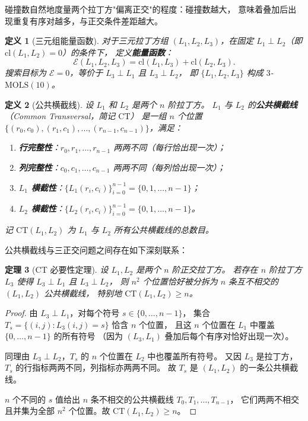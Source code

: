 \documentclass[11pt,a4paper]{ctexart}
\newtheorem{theorem}{定理}[section]
\newtheorem{definition}[theorem]{定义}
\theoremstyle{remark}
\newcommand{\CT}{\mathrm{CT}}
\newcommand{\cl}{\mathrm{cl}}
\newcommand{\E}{\mathcal{E}}
\newcommand{\MOLS}{\mathrm{MOLS}}
\begin{document}
碰撞数自然地度量两个拉丁方"偏离正交"的程度：碰撞数越大，
意味着叠加后出现重复有序对越多，与正交条件差距越大。

\begin{definition}[三元组能量函数]
  \label{def:energy}
  对于三元拉丁方组 $(L_1, L_2, L_3)$，在固定 $L_1 \perp L_2$（即 $\cl(L_1, L_2) = 0$）的条件下，
  定义\textbf{能量函数}：
  \[
    \E(L_1, L_2, L_3) = \cl(L_1, L_3) + \cl(L_2, L_3).
  \]
  搜索目标为 $\E = 0$，等价于 $L_3 \perp L_1$ 且 $L_3 \perp L_2$，
  即 $\{L_1, L_2, L_3\}$ 构成 $3$-$\MOLS(10)$。
\end{definition}

\begin{definition}[公共横截线]
  设 $L_1$ 和 $L_2$ 是两个 $n$ 阶拉丁方。
  $L_1$ 与 $L_2$ 的\textbf{公共横截线}（Common Transversal，简记 $\CT$）
  是一组 $n$ 个位置 $\{(r_0, c_0), (r_1, c_1), \ldots, (r_{n-1}, c_{n-1})\}$，满足：
  \begin{enumerate}[label=(\roman*)]
    \item \textbf{行完整性}：$r_0, r_1, \ldots, r_{n-1}$ 两两不同（每行恰出现一次）；
    \item \textbf{列完整性}：$c_0, c_1, \ldots, c_{n-1}$ 两两不同（每列恰出现一次）；
    \item \textbf{$L_1$ 横截性}：$\{L_1(r_i, c_i)\}_{i=0}^{n-1} = \{0, 1, \ldots, n-1\}$；
    \item \textbf{$L_2$ 横截性}：$\{L_2(r_i, c_i)\}_{i=0}^{n-1} = \{0, 1, \ldots, n-1\}$。
  \end{enumerate}
  记 $\CT(L_1, L_2)$ 为 $L_1$ 与 $L_2$ 所有公共横截线的总数目。
\end{definition}

公共横截线与三正交问题之间存在如下深刻联系：

\begin{theorem}[CT 必要性定理]
  \label{thm:ct-necessary}
  设 $L_1, L_2$ 是两个 $n$ 阶正交拉丁方。
  若存在 $n$ 阶拉丁方 $L_3$ 使得 $L_3 \perp L_1$ 且 $L_3 \perp L_2$，
  则 $n^2$ 个位置恰好被分拆为 $n$ 条互不相交的 $(L_1, L_2)$ 公共横截线，
  特别地 $\CT(L_1, L_2) \ge n$。
\end{theorem}

\begin{proof}
  由 $L_3 \perp L_1$，对每个符号 $s \in \{0, \ldots, n-1\}$，
  集合 $T_s = \{(i,j) : L_3(i,j) = s\}$ 恰含 $n$ 个位置，
  且这 $n$ 个位置在 $L_1$ 中覆盖 $\{0,\ldots,n-1\}$ 的所有符号
  （因为 $(L_3, L_1)$ 叠加后每个有序对恰好出现一次）。

  同理由 $L_3 \perp L_2$，$T_s$ 的 $n$ 个位置在 $L_2$ 中也覆盖所有符号。
  又因 $L_3$ 是拉丁方，$T_s$ 的行指标两两不同，列指标亦两两不同。
  故 $T_s$ 是 $(L_1, L_2)$ 的一条公共横截线。

  $n$ 个不同的 $s$ 值给出 $n$ 条不相交的公共横截线 $T_0, T_1, \ldots, T_{n-1}$，
  它们两两不相交且并集为全部 $n^2$ 个位置。故 $\CT(L_1, L_2) \ge n$。
\end{proof}
\end{document}

